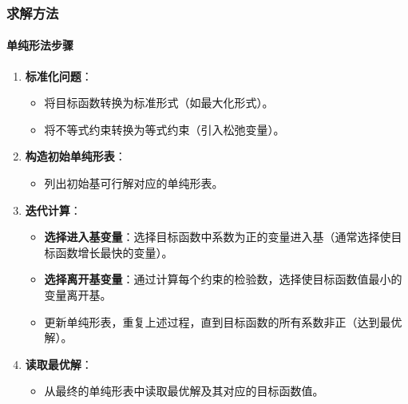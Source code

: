 \documentclass[UTF8]{ctexart}
\begin{document}
\subsubsection {求解方法}
\paragraph{单纯形法步骤}
\begin{enumerate}
    \item \textbf{标准化问题}：
        \begin{itemize}
            \item 将目标函数转换为标准形式（如最大化形式）。
            \item 将不等式约束转换为等式约束（引入松弛变量）。
        \end{itemize}
    \item \textbf{构造初始单纯形表}：
        \begin{itemize}
            \item 列出初始基可行解对应的单纯形表。
        \end{itemize}
    \item \textbf{迭代计算}：
        \begin{itemize}
            \item \textbf{选择进入基变量}：选择目标函数中系数为正的变量进入基（通常选择使目标函数增长最快的变量）。
            \item \textbf{选择离开基变量}：通过计算每个约束的检验数，选择使目标函数值最小的变量离开基。
            \item 更新单纯形表，重复上述过程，直到目标函数的所有系数非正（达到最优解）。
        \end{itemize}
    \item \textbf{读取最优解}：
        \begin{itemize}
            \item 从最终的单纯形表中读取最优解及其对应的目标函数值。
        \end{itemize}
\end{enumerate}
\end{document}
